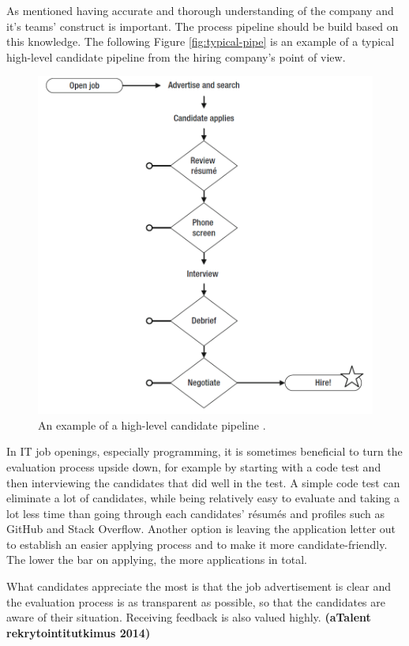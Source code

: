 \documentclass[11pt,a4paper,oneside,article]{memoir}
\begin{document}
\pagebreak

As mentioned having accurate and thorough understanding of the company and it's teams' construct is important. The process pipeline should be build based on this knowledge. The following Figure \vref{fig:typical-pipe} is an example of a typical high-level candidate pipeline from the hiring company's point of view.

\begin{figure}[h]
  \centering
  \includegraphics[width=12.2cm]{typical_pipe}
  \caption{An example of a high-level candidate pipeline \cite[p.~28]{mcculler:book}.}
  \label{fig:typical-pipe}
\end{figure}

In IT job openings, especially programming, it is sometimes beneficial to turn the evaluation process upside down, for example by starting with a code test and then interviewing the candidates that did well in the test. A simple code test can eliminate a lot of candidates, while being relatively easy to evaluate and taking a lot less time than going through each candidates' résumés and profiles such as GitHub and Stack Overflow. Another option is leaving the application letter out to establish an easier applying process and to make it more candidate-friendly. The lower the bar on applying, the more applications in total. \cite{noora:conversation}

What candidates appreciate the most is that the job advertisement is clear and the evaluation process is as transparent as possible, so that the candidates are aware of their situation. Receiving feedback is also valued highly. \textbf{(aTalent rekrytointitutkimus 2014)} %
\end{document}
